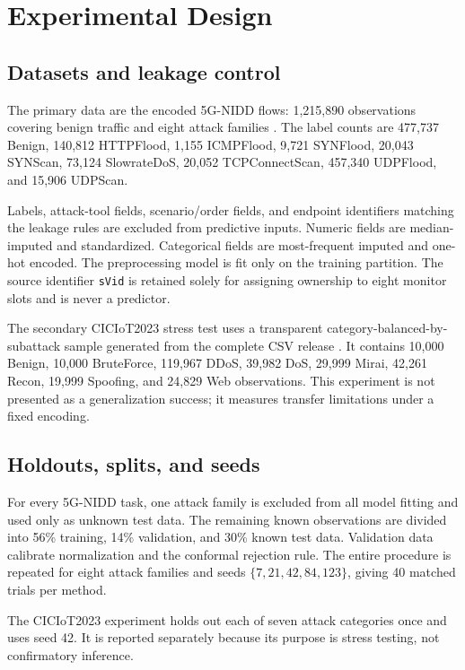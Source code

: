 \section{Experimental Design}

\subsection{Datasets and leakage control}

The primary data are the encoded 5G-NIDD flows: 1,215,890 observations covering benign traffic and eight attack families \cite{siriwardhana2025descriptor}. The label counts are 477,737 Benign, 140,812 HTTPFlood, 1,155 ICMPFlood, 9,721 SYNFlood, 20,043 SYNScan, 73,124 SlowrateDoS, 20,052 TCPConnectScan, 457,340 UDPFlood, and 15,906 UDPScan.

Labels, attack-tool fields, scenario/order fields, and endpoint identifiers matching the leakage rules are excluded from predictive inputs. Numeric fields are median-imputed and standardized. Categorical fields are most-frequent imputed and one-hot encoded. The preprocessing model is fit only on the training partition. The source identifier \texttt{sVid} is retained solely for assigning ownership to eight monitor slots and is never a predictor.

The secondary CICIoT2023 stress test uses a transparent category-balanced-by-subattack sample generated from the complete CSV release \cite{neto2023ciciot}. It contains 10,000 Benign, 10,000 BruteForce, 119,967 DDoS, 39,982 DoS, 29,999 Mirai, 42,261 Recon, 19,999 Spoofing, and 24,829 Web observations. This experiment is not presented as a generalization success; it measures transfer limitations under a fixed encoding.

\subsection{Holdouts, splits, and seeds}

For every 5G-NIDD task, one attack family is excluded from all model fitting and used only as unknown test data. The remaining known observations are divided into 56\% training, 14\% validation, and 30\% known test data. Validation data calibrate normalization and the conformal rejection rule. The entire procedure is repeated for eight attack families and seeds $\{7,21,42,84,123\}$, giving 40 matched trials per method.

The CICIoT2023 experiment holds out each of seven attack categories once and uses seed 42. It is reported separately because its purpose is stress testing, not confirmatory inference.


